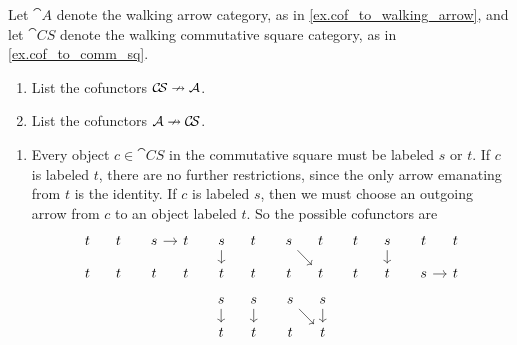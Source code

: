 \documentclass[Book-Poly]{subfiles}
\begin{document}
\begin{exercise}
Let $\cat{A}$ denote the walking arrow category, as in \cref{ex.cof_to_walking_arrow}, and let $\cat{C\!S}$ denote the walking commutative square category, as in \cref{ex.cof_to_comm_sq}.
\begin{enumerate}
    \item List the cofunctors $\mathcal{C\!S}\nrightarrow\mathcal{A}$.
    \item List the cofunctors $\mathcal{A}\nrightarrow\mathcal{C\!S}$.\qedhere
\end{enumerate}
\begin{solution}
\begin{enumerate}
    \item Every object $c\in \cat{C\!S}$ in the commutative square must be labeled $s$ or $t$.
    If $c$ is labeled $t$, there are no further restrictions, since the only arrow emanating from $t$ is the identity.
    If $c$ is labeled $s$, then we must choose an outgoing arrow from $c$ to an object labeled $t$. So the possible cofunctors are
\[
    \begin{tikzcd}[sep=10pt]
        t&t\\
	t&t
    \end{tikzcd}
	\quad\;
    \begin{tikzcd}[sep=10pt]
        s\ar[r]&t\\
	t&t
    \end{tikzcd}
	\quad\;
    \begin{tikzcd}[sep=10pt]
        s\ar[d]&t\\
	t&t
    \end{tikzcd}
	\quad\;
    \begin{tikzcd}[sep=10pt]
        s\ar[dr]&t\\
	t&t
    \end{tikzcd}
	\quad\;
    \begin{tikzcd}[sep=10pt]
        t&s\ar[d]\\
	t&t
    \end{tikzcd}
	\quad\;
    \begin{tikzcd}[sep=10pt]
        t&t\\
	s\ar[r]&t
    \end{tikzcd}
\]
\[
    \begin{tikzcd}[sep=10pt]
        s\ar[d]&s\ar[d]\\
	t&t
    \end{tikzcd}
	\quad\;
    \begin{tikzcd}[sep=10pt]
        s\ar[dr]&s\ar[d]\\
	t&t
    \end{tikzcd}
\]
\end{enumerate}
\end{solution}
\end{exercise}
\end{document}

